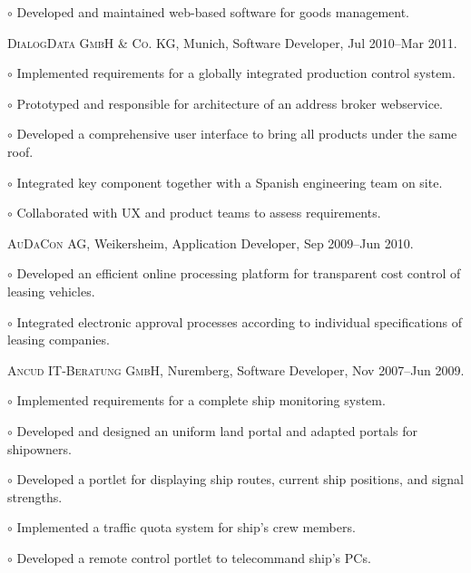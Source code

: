 \documentclass[letterpaper]{article}
\renewenvironment{itemize}{
  \begin{list}{}{
    \setlength{\leftmargin}{1.5em}
  }
}{
  \end{list}
}
\newenvironment{no-indent-itemize}{
  \begin{list}{}{
    \setlength{\leftmargin}{0em}
  }
}{
  \end{list}
}
\def\bullet{$\circ$\xspace}
\begin{document}
\begin{no-indent-itemize}
\begin{itemize}
    \item\bullet Developed and maintained web-based software for goods management.
  \end{itemize}
  \item \textsc{DialogData GmbH \& Co. KG}, Munich, Software Developer, Jul 2010--Mar 2011.
  \begin{itemize}
	\item\bullet Implemented requirements for a globally integrated production control system.
	\item\bullet Prototyped and responsible for architecture of an address broker webservice.
	\item\bullet Developed a comprehensive user interface to bring all products under the same roof.
	\item\bullet Integrated key component together with a Spanish engineering team on site.
    \item\bullet Collaborated with UX and product teams to assess requirements.
  \end{itemize}
    \item \textsc{AuDaCon AG}, Weikersheim, Application Developer, Sep 2009--Jun 2010.
  \begin{itemize}
    \item\bullet Developed an efficient online processing platform for transparent cost control of leasing vehicles.
    \item\bullet Integrated electronic approval processes according to individual specifications of leasing companies.
  \end{itemize}
    \item \textsc{Ancud IT-Beratung GmbH}, Nuremberg, Software Developer, Nov 2007--Jun 2009.
  \begin{itemize}
    \item\bullet Implemented requirements for a complete ship monitoring system.
    \item\bullet Developed and designed an uniform land portal and adapted portals for shipowners.
    \item\bullet Developed a portlet for displaying ship routes, current ship positions, and signal strengths.
    \item\bullet Implemented a traffic quota system for ship's crew members.
    \item\bullet Developed a remote control portlet to telecommand ship's PCs.
  \end{itemize}
\end{no-indent-itemize}
\end{document}
